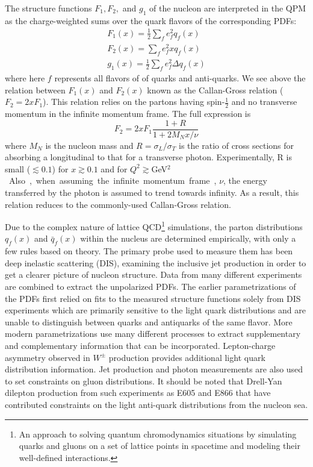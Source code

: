 The structure functions $F_1, F_2,$ and $g_1$ of the nucleon are interpreted in the QPM as the charge-weighted sums over the quark flavors of the corresponding PDFs:
\begin{eqnarray}
F_1(x) = \frac{1}{2} \sum\limits_f e_f^2 q_f(x) \label{eq:f1} \\
F_2(x) = \sum\limits_f e_f^2 x q_f(x) \label{eq:callan-gross} \label{eq:f2} \\
g_1(x) = \frac{1}{2} \sum\limits_f e_f^2 \Delta q_f(x) \label{eq:g1}
\end{eqnarray}
where here $f$ represents all flavors of of quarks and anti-quarks. We see above the relation between $F_1(x)$ and $F_2(x)$ known as the Callan-Gross relation ($F_2 = 2xF_1$). This relation relies on the partons having spin-$\frac{1}{2}$ and no transverse momentum in the infinite momentum frame. The full expression is
\begin{equation}
F_2 = 2xF_1 \frac{1 + R}{1 + 2 M_N x/\nu}
\end{equation}
where $M_N$ is the nucleon mass and $R=\sigma_L/\sigma_T$ is the ratio of cross sections for absorbing a longitudinal to that for a transverse photon. Experimentally, R is small\cite{PhysRevLett.61.1061} ($\lesssim0.1$) for $x\gtrsim0.1$ and for $Q^2\gtrsim$\unit[5]{GeV$^2$}. Also, when assuming the infinite momentum frame, $\nu$, the energy transferred by the photon is assumed to trend towards infinity. As a result, this relation reduces to the commonly-used Callan-Gross relation.

Due to the complex nature of lattice QCD\footnote{An approach to solving quantum chromodynamics situations by simulating quarks and gluons on a set of lattice points in spacetime and modeling their well-defined interactions.} simulations, the parton distributions $q_f(x)$ and $\bar{q}_f(x)$ within the nucleus are determined empirically, with only a few rules based on theory. The primary probe used to measure them has been deep inelastic scattering (DIS), examining the inclusive jet production in order to get a clearer picture of nucleon structure. Data from many different experiments are combined  to extract the unpolarized PDFs. The earlier parametrizations of the PDFs first relied on fits to the measured structure functions solely from DIS experiments which are primarily sensitive to the light quark distributions and are unable to distinguish between quarks and antiquarks of the same flavor. More modern parametrizations use many different processes to extract supplementary and complementary information that can be incorporated. Lepton-charge asymmetry observed in $W^\pm$ production provides additional light quark distribution information. Jet production and photon measurements are also used to set constraints on gluon distributions. It should be noted that Drell-Yan dilepton production from such experiments as E605 and E866 that have contributed constraints on the light anti-quark distributions from the nucleon sea.


